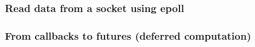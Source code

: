 % 
\begin{frame}[fragile]
    \frametitle{Read data from a socket using epoll}
\end{frame}
% 
% 
% 
% 
% 
% 
\begin{frame}[fragile]
    \frametitle{From callbacks to futures (deferred computation)}
\end{frame}
% 
% 
% 
% 
% 

